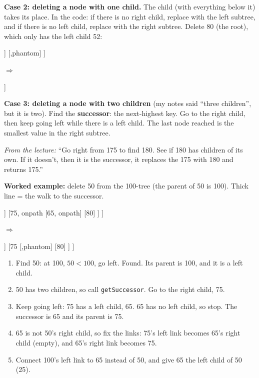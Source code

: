 \documentclass[11pt]{article}
\begin{document}
	\textbf{Case 2: deleting a node with one child.} The child (with everything below it) takes its place. In the code: if there is no right child, replace with the left subtree, and if there is no left child, replace with the right subtree. Delete 80 (the root), which only has the left child 52:
	\begin{center}
		\begin{forest}
			[80
			[52, onpath
			[48]
			[71]
			]
			[,phantom]
			]
		\end{forest}
		\quad$\Rightarrow$\quad
		\begin{forest}
			[52
			[48]
			[71]
			]
		\end{forest}
	\end{center}
	
	\textbf{Case 3: deleting a node with two children} (my notes said ``three children'', but it is two).
	Find the \textbf{successor}: the next-highest key. Go to the right child, then keep going left while there is a left child. The last node reached is the smallest value in the right subtree.
	
	\emph{From the lecture:} ``Go right from 175 to find 180. See if 180 has children of its own. If it doesn't, then it is the successor, it replaces the 175 with 180 and returns 175.''
	
	\textbf{Worked example:} delete 50 from the 100-tree (the parent of 50 is 100). Thick line = the walk to the successor.
	\begin{center}
		\begin{forest}
			[50
			[25
			[10]
			[40]
			]
			[75, onpath
			[65, onpath]
			[80]
			]
			]
		\end{forest}
		\quad$\Rightarrow$\quad
		\begin{forest}
			[65
			[25
			[10]
			[40]
			]
			[75
			[,phantom]
			[80]
			]
			]
		\end{forest}
	\end{center}
	\begin{enumerate}
		\item Find 50: at 100, $50<100$, go left. Found. Its parent is 100, and it is a left child.
		\item 50 has two children, so call \texttt{getSuccessor}. Go to the right child, 75.
		\item Keep going left: 75 has a left child, 65. 65 has no left child, so stop. The successor is 65 and its parent is 75.
		\item 65 is not 50's right child, so fix the links: 75's left link becomes 65's right child (empty), and 65's right link becomes 75.
		\item Connect 100's left link to 65 instead of 50, and give 65 the left child of 50 (25).
	\end{enumerate}
	
\end{document}

